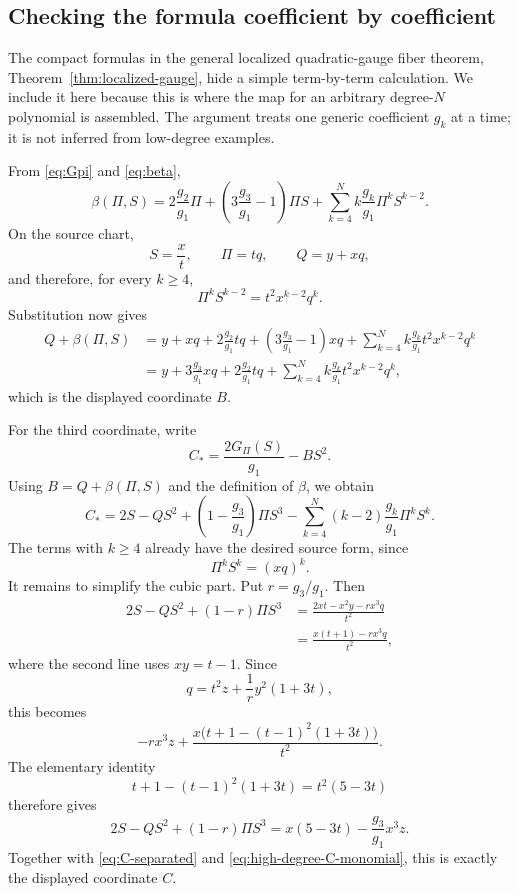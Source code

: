 \subsection{Checking the formula coefficient by coefficient}
\label{subsec:gauge-identities}

The compact formulas in the general localized quadratic-gauge fiber theorem,
Theorem~\ref{thm:localized-gauge}, hide a simple
term-by-term calculation.  We include it here because this is where the map for
an arbitrary degree-$N$ polynomial is assembled.  The argument treats one
generic coefficient $g_k$ at a time; it is not inferred from low-degree
examples.

From \eqref{eq:Gpi} and \eqref{eq:beta},
\begin{equation}
 \beta(\Pi,S)
 =2\frac{g_2}{g_1}\Pi
  +\left(3\frac{g_3}{g_1}-1\right)\Pi S
  +\sum_{k=4}^N k\frac{g_k}{g_1}\Pi^kS^{k-2}.
 \label{eq:beta-expanded}
\end{equation}
On the source chart,
\[
 S=\frac{x}{t},\qquad \Pi=tq,\qquad Q=y+xq,
\]
and therefore, for every $k\geq4$,
\begin{equation}
 \Pi^kS^{k-2}=t^2x^{k-2}q^k.
 \label{eq:high-degree-B-monomial}
\end{equation}
Substitution now gives
\begin{align*}
 Q+\beta(\Pi,S)
 &=y+xq+2\frac{g_2}{g_1}tq
   +\left(3\frac{g_3}{g_1}-1\right)xq
   +\sum_{k=4}^N k\frac{g_k}{g_1}t^2x^{k-2}q^k\\
 &=y+3\frac{g_3}{g_1}xq+2\frac{g_2}{g_1}tq
   +\sum_{k=4}^N k\frac{g_k}{g_1}t^2x^{k-2}q^k,
\end{align*}
which is the displayed coordinate $B$.

For the third coordinate, write
\[
 C_*=\frac{2G_\Pi(S)}{g_1}-BS^2.
\]
Using $B=Q+\beta(\Pi,S)$ and the definition of $\beta$, we obtain
\begin{equation}
 C_*=2S-QS^2+\left(1-\frac{g_3}{g_1}\right)\Pi S^3
 -\sum_{k=4}^N(k-2)\frac{g_k}{g_1}\Pi^kS^k.
 \label{eq:C-separated}
\end{equation}
The terms with $k\geq4$ already have the desired source form, since
\begin{equation}
 \Pi^kS^k=(xq)^k.
 \label{eq:high-degree-C-monomial}
\end{equation}
It remains to simplify the cubic part.  Put $r=g_3/g_1$.  Then
\begin{align*}
 2S-QS^2+(1-r)\Pi S^3
 &=\frac{2xt-x^2y-rx^3q}{t^2}\\
 &=\frac{x(t+1)-rx^3q}{t^2},
\end{align*}
where the second line uses $xy=t-1$.  Since
\[
 q=t^2z+\frac1r y^2(1+3t),
\]
this becomes
\[
 -rx^3z+\frac{x\bigl(t+1-(t-1)^2(1+3t)\bigr)}{t^2}.
\]
The elementary identity
\begin{equation}
 t+1-(t-1)^2(1+3t)=t^2(5-3t)
 \label{eq:cubic-cancellation}
\end{equation}
therefore gives
\[
 2S-QS^2+(1-r)\Pi S^3=x(5-3t)-\frac{g_3}{g_1}x^3z.
\]
Together with \eqref{eq:C-separated} and
\eqref{eq:high-degree-C-monomial}, this is exactly the displayed coordinate
$C$.

